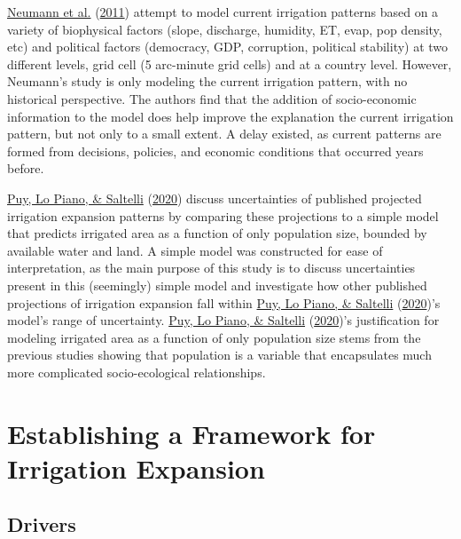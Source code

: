 \documentclass[12pt,twoside]{reedthesis}
\begin{document}
\protect\hyperlink{ref-neumannExploringGlobalIrrigation2011}{Neumann et al.} (\protect\hyperlink{ref-neumannExploringGlobalIrrigation2011}{2011}) attempt to model current irrigation patterns based on a variety of biophysical factors (slope, discharge, humidity, ET, evap, pop density, etc) and political factors (democracy, GDP, corruption, political stability) at two different levels, grid cell (5 arc-minute grid cells) and at a country level. However, Neumann's study is only modeling the current irrigation pattern, with no historical perspective. The authors find that the addition of socio-economic information to the model does help improve the explanation the current irrigation pattern, but not only to a small extent. A delay existed, as current patterns are formed from decisions, policies, and economic conditions that occurred years before.

\protect\hyperlink{ref-puyCurrentModelsUnderestimate2020}{Puy, Lo Piano, \& Saltelli} (\protect\hyperlink{ref-puyCurrentModelsUnderestimate2020}{2020}) discuss uncertainties of published projected irrigation expansion patterns by comparing these projections to a simple model that predicts irrigated area as a function of only population size, bounded by available water and land. A simple model was constructed for ease of interpretation, as the main purpose of this study is to discuss uncertainties present in this (seemingly) simple model and investigate how other published projections of irrigation expansion fall within \protect\hyperlink{ref-puyCurrentModelsUnderestimate2020}{Puy, Lo Piano, \& Saltelli} (\protect\hyperlink{ref-puyCurrentModelsUnderestimate2020}{2020})'s model's range of uncertainty. \protect\hyperlink{ref-puyCurrentModelsUnderestimate2020}{Puy, Lo Piano, \& Saltelli} (\protect\hyperlink{ref-puyCurrentModelsUnderestimate2020}{2020})'s justification for modeling irrigated area as a function of only population size stems from the previous studies showing that population is a variable that encapsulates much more complicated socio-ecological relationships.

\hypertarget{drivers}{%
\section{Establishing a Framework for Irrigation Expansion}\label{drivers}}

\hypertarget{drivers-1}{%
\subsection{Drivers}\label{drivers-1}}
\end{document}
